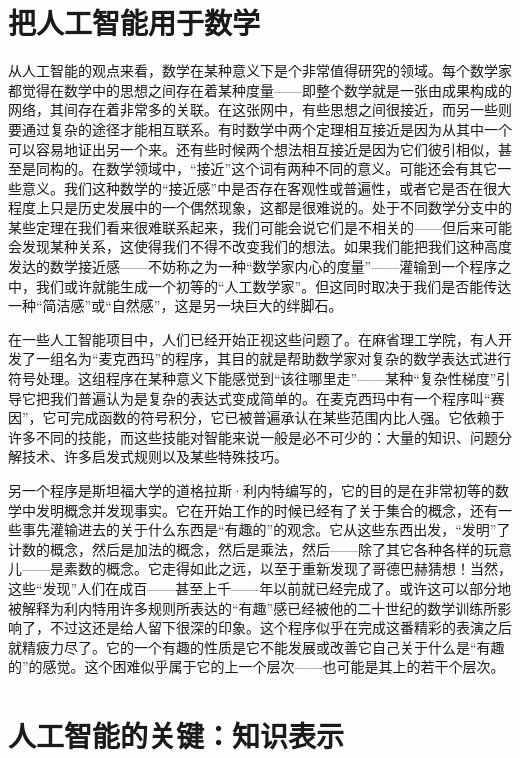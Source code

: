 \section{把人工智能用于数学}

从人工智能的观点来看，数学在某种意义下是个非常值得研究的领域。每个数学家都觉得在数学中的思想之间存在着某种度量——即整个数学就是一张由成果构成的网络，其间存在着非常多的关联。在这张网中，有些思想之间很接近，而另一些则要通过复杂的途径才能相互联系。有时数学中两个定理相互接近是因为从其中一个可以容易地证出另一个来。还有些时候两个想法相互接近是因为它们彼引相似，甚至是同构的。在数学领域中，“接近”这个词有两种不同的意义。可能还会有其它一些意义。我们这种数学的“接近感”中是否存在客观性或普遍性，或者它是否在很大程度上只是历史发展中的一个偶然现象，这都是很难说的。处于不同数学分支中的某些定理在我们看来很难联系起来，我们可能会说它们是不相关的——但后来可能会发现某种关系，这使得我们不得不改变我们的想法。如果我们能把我们这种高度发达的数学接近感——不妨称之为一种“数学家内心的度量”——灌输到一个程序之中，我们或许就能生成一个初等的“人工数学家”。但这同时取决于我们是否能传达一种“简洁感”或“自然感”，这是另一块巨大的绊脚石。

在一些人工智能项目中，人们已经开始正视这些问题了。在麻省理工学院，有人开发了一组名为“麦克西玛”的程序，其目的就是帮助数学家对复杂的数学表达式进行符号处理。这组程序在某种意义下能感觉到“该往哪里走”——某种“复杂性梯度”引导它把我们普遍认为是复杂的表达式变成简单的。在麦克西玛中有一个程序叫“赛因”，它可完成函数的符号积分，它已被普遍承认在某些范围内比人强。它依赖于许多不同的技能，而这些技能对智能来说一般是必不可少的：大量的知识、问题分解技术、许多启发式规则以及某些特殊技巧。

另一个程序是斯坦福大学的道格拉斯·利内特编写的，它的目的是在非常初等的数学中发明概念并发现事实。它在开始工作的时候已经有了关于集合的概念，还有一些事先灌输进去的关于什么东西是“有趣的”的观念。它从这些东西出发，“发明”了计数的概念，然后是加法的概念，然后是乘法，然后——除了其它各种各样的玩意儿——是素数的概念。它走得如此之远，以至于重新发现了哥德巴赫猜想！当然，这些“发现”人们在成百——甚至上千——年以前就已经完成了。或许这可以部分地被解释为利内特用许多规则所表达的“有趣”感已经被他的二十世纪的数学训练所影响了，不过这还是给人留下很深的印象。这个程序似乎在完成这番精彩的表演之后就精疲力尽了。它的一个有趣的性质是它不能发展或改善它自己关于什么是“有趣的”的感觉。这个困难似乎属于它的上一个层次——也可能是其上的若干个层次。

\section{人工智能的关键：知识表示}

